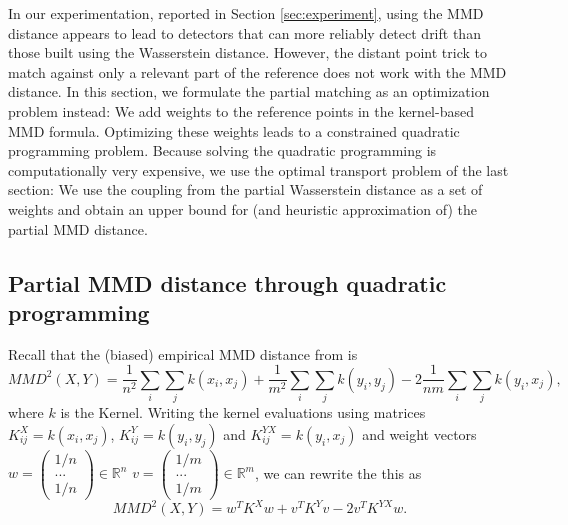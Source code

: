 \documentclass[a4paper,twoside,10pt]{article}
\theoremstyle{plain}
\theoremstyle{remark}
\begin{document}
In our experimentation, reported in Section \ref{sec:experiment}, using the MMD distance appears to lead to detectors that can more reliably detect drift than
those built using the Wasserstein distance. However, the distant point trick to match against only a relevant part of the reference does not work with the MMD distance. In this section, we formulate the partial matching as an optimization problem instead: We add weights to the reference points in the kernel-based MMD formula. Optimizing these weights leads to a constrained quadratic programming problem. Because solving the quadratic programming is computationally very expensive, we use the optimal transport problem of the last section: We use the coupling from the partial Wasserstein distance as a set of weights and obtain an upper bound for (and heuristic approximation of) the partial MMD distance.

\subsection{Partial MMD distance through quadratic programming}

Recall that the (biased) empirical MMD distance from \cite{Gretton} is
\[
MMD^2(X, Y) = \frac{1}{n^2} \sum_{i} \sum_{j} k(x_i, x_j)
           + \frac{1}{m^2} \sum_{i} \sum_{j} k(y_i, y_j)
           - 2 \frac{1}{n m} \sum_{i} \sum_{j} k(y_i, x_j),
\]
where $k$ is the Kernel. Writing the kernel evaluations using
matrices $K^X_{ij} = k(x_i, x_j)$, $K^Y_{ij} = k(y_i, y_j)$ and $K^{YX}_{ij} = k(y_i, x_j)$ and weight vectors
$w = \left(\begin{smallmatrix}1/n\\...\\1/n\end{smallmatrix}\right) \in \mathbb{R}^n$
$v = \left(\begin{smallmatrix}1/m\\...\\1/m\end{smallmatrix}\right) \in \mathbb{R}^m$, we can rewrite the this as
\begin{equation}
  \label{eq:mmd_matrix}
MMD^2(X, Y) = w^T K^X w + v^T K^{Y} v - 2 v^T K^{YX} w.
\end{equation}
\end{document}
